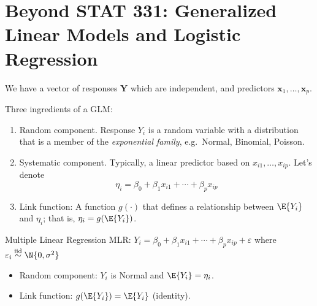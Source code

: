 \section{Beyond STAT 331:
  Generalized Linear Models and Logistic Regression}
We have a vector of responses $ \symbf{Y} $
which are independent, and predictors
$ \symbf{x}_1,\ldots,\symbf{x}_p $.

Three ingredients of a GLM\@:
\begin{enumerate}
    \item Random component. Response $ Y_i $ is a random
          variable with a distribution that is a member of the
          \emph{exponential family}, e.g.\ Normal,
          Binomial, Poisson.
    \item Systematic component. Typically, a linear predictor
          based on $ x_{i1},\ldots,x_{ip} $. Let's denote
          \[ \eta_i=\beta_0+\beta_1x_{i1}+\cdots+\beta_p x_{i p} \]
    \item Link function: A function $ g(\cdot) $ that defines
          a relationship between $ \E{Y_i} $ and $ \eta_i $;
          that is, $ \eta_i=g(\E{Y_i}) $.
\end{enumerate}
\begin{Example}{Multiple Linear Regression}{}
    MLR\@: $ Y_i=\beta_0+\beta_1x_{i1}+\cdots+\beta_p x_{i p}+\varepsilon $
    where $ \varepsilon_i\stackrel{\text{iid}}{\sim}\N{0,\sigma^2} $
    \begin{itemize}
        \item Random component: $ Y_i $ is Normal and $ \E{Y_i}=\eta_i $.
        \item Link function: $ g(\E{Y_i})=\E{Y_i} $ (identity).
    \end{itemize}
\end{Example}
